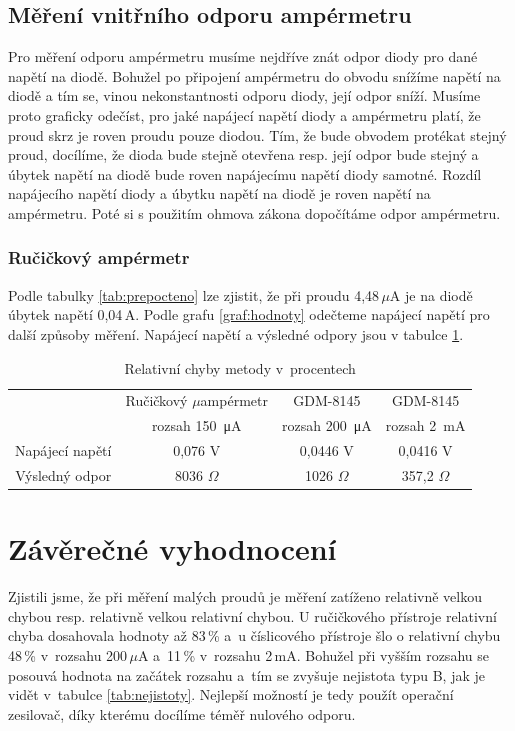 \documentclass[a4paper,12pt]{article}   %
\newcommand{\tmu}{$\mu$}
\begin{document}
\subsection{Měření vnitřního odporu ampérmetru}
Pro měření odporu ampérmetru musíme nejdříve znát odpor diody pro dané napětí na diodě. Bohužel po připojení ampérmetru do obvodu snížíme napětí na diodě a tím se, vinou nekonstantnosti odporu diody, její odpor sníží. Musíme proto graficky odečíst, pro jaké napájecí napětí diody a ampérmetru platí, že proud skrz je roven proudu pouze diodou. Tím, že bude obvodem protékat stejný proud, docílíme, že dioda bude stejně otevřena resp. její odpor bude stejný a úbytek napětí na diodě bude roven napájecímu napětí diody samotné. Rozdíl napájecího napětí diody a úbytku napětí na diodě je roven napětí na ampérmetru. Poté si s použitím ohmova zákona dopočítáme odpor ampérmetru.

\subsubsection{Ručičkový ampérmetr}
Podle tabulky \ref{tab:prepocteno} lze zjistit, že při proudu 4,48\,\tmu A je na diodě úbytek napětí 0,04\,A. Podle grafu \ref{graf:hodnoty} odečteme napájecí napětí pro další způsoby měření. Napájecí napětí a výsledné odpory jsou v tabulce \ref{tab:napajeni}.
\begin{table}[h!]
    \centering
    \begin{tabular}{|c|c|c|c|}
        \hline
        \rule{0pt}{2.5ex}
        \multirow{2}{*}{} &Ručičkový \tmu ampérmetr	&GDM-8145 	&GDM-8145 \\[.7ex]
        & rozsah  150~μA & rozsah 200~μA & rozsah  2~mA \\\hline\hline
        Napájecí napětí & 0,076 V& 0,0446 V & 0,0416 V\\\hline
        Výsledný odpor & 8036 $\Omega$  & 1026 $\Omega$ & 357,2 $\Omega$   \\\hline
        
    \end{tabular}
    \caption{Relativní chyby metody v~procentech}
    \label{tab:napajeni}
\end{table}



\section{Závěrečné vyhodnocení}
Zjistili jsme, že při měření malých proudů je měření zatíženo relativně velkou chybou resp. relativně velkou relativní chybou. U ručičkového přístroje relativní chyba dosahovala hodnoty až 83\,\% a~u číslicového přístroje šlo o relativní chybu 48\,\% v~rozsahu 200\,\tmu A a~11\,\% v~rozsahu 2\,mA. Bohužel při vyšším rozsahu se posouvá hodnota na začátek rozsahu a~tím se zvyšuje nejistota typu B, jak je vidět v~tabulce \ref{tab:nejistoty}. Nejlepší možností je tedy použít operační zesilovač, díky kterému docílíme téměř nulového odporu.
\end{document}
